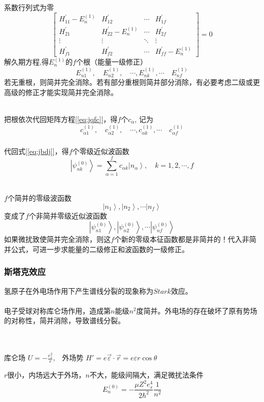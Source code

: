 \begin{frame}
  \frametitle{}
  系数行列式为零
\[\begin{bmatrix}H^{\prime}_{11} -E^{(1)}_n &H^{\prime}_{12}&\cdots&H^{\prime}_{1f}\\
  H^{\prime}_{21}&H^{\prime}_{22}-E^{(1)}_n&\cdots&H^{\prime}_{2f}\\\vdots&\vdots&\ddots&\vdots\\H^{\prime}_{f 1}&H^{\prime}_{f 2}&\cdots&H^{\prime}_{ff}-E^{(1)}_n\end{bmatrix} =0\]
  解久期方程,得$E_n^{(1)}$的$f$个根（能量一级修正）
  \[ E_{n1} ^{(1)}, \quad  E_{n2} ^{(1)}, \quad\cdots, E_{nk} ^{(1)}, \cdots\quad E_{nf} ^{(1)}\]
  若无重根，则简并完全消除。若有部分重根则简并部分消除，有必要考虑二级或更高级的修正才能实现简并完全消除。

  ~~\\ 
  把根依次代回矩阵方程[\ref{eq:jqfc}]，得$f$个$c_\alpha$, 记为 
  \[ c_{\alpha 1} ^{(1)}, \quad  c_{\alpha 2} ^{(1)}, \quad\cdots, c_{\alpha k} ^{(1)}, \cdots\quad c_{\alpha f} ^{(1)}\]
\end{frame} 

\begin{frame}
  \frametitle{}
代回式[\ref{eq:jbdj}]，得$f$个零级近似波函数
\[ \left\vert \psi ^{(0)}_{nk} \right\rangle = \sum_{\alpha=1}^f
c_{\alpha k} \left\vert n_\alpha \right\rangle  , \quad k =1,2,\cdots, f\]

~~\\ 
$f$个简并的零级波函数
$$ \left\vert n_1 \right\rangle, \left\vert n_2 \right\rangle,\cdots \left\vert n_f \right\rangle $$
变成了$f$个非简并零级近似波函数
$$ \left\vert \psi ^{(0)}_{n 1} \right\rangle, \left\vert \psi ^{(0)}_{n2} \right\rangle,\cdots \left\vert \psi ^{(0)}_{nf} \right\rangle  $$
如果微扰致使简并完全消除，则这$f$个新的零级本征函数都是非简并的！代入非简并公式，可进一步求能量的二级修正和波函数的一级修正。
\end{frame} 

\begin{frame}
  \frametitle{斯塔克效应}
  \emf[定义：]氢原子在外电场作用下产生谱线分裂的现象称为$Stark$效应。\\
~~\\ 
\emf[定性分析：]电子受球对称库仑场作用，造成第$n$能级$n^2$度简并。外电场的存在破坏了原有势场的对称性，简并消除，导致谱线分裂。

~~\\ 
\emf[定量计算：]\\
库仑场 $U=-\frac{e^2_s}{r}$,$\quad $外场势 $H'=e\vec{\varepsilon}\cdot \vec{r} = e \varepsilon r \cos\theta$

$r$很小，内场远大于外场，$n$不大，能级间隔大，满足微扰法条件 
$$E_n^{(0)} = - \frac{\mu Z^2 e_s^4}{2\hbar^2}\frac{1}{n^2}$$
\end{frame} 

